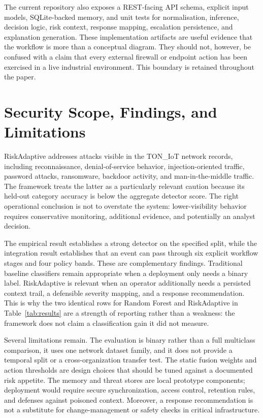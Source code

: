 \documentclass[conference]{IEEEtran}
\begin{document}
The current repository also exposes a REST-facing API schema, explicit input models, SQLite-backed memory, and unit tests for normalisation, inference, decision logic, risk context, response mapping, escalation persistence, and explanation generation. These implementation artifacts are useful evidence that the workflow is more than a conceptual diagram. They should not, however, be confused with a claim that every external firewall or endpoint action has been exercised in a live industrial environment. This boundary is retained throughout the paper.

\section{Security Scope, Findings, and Limitations}
RiskAdaptive addresses attacks visible in the TON\_IoT network records, including reconnaissance, denial-of-service behavior, injection-oriented traffic, password attacks, ransomware, backdoor activity, and man-in-the-middle traffic. The framework treats the latter as a particularly relevant caution because its held-out category accuracy is below the aggregate detector score. The right operational conclusion is not to overstate the system: lower-visibility behavior requires conservative monitoring, additional evidence, and potentially an analyst decision.

The empirical result establishes a strong detector on the specified split, while the integration result establishes that an event can pass through six explicit workflow stages and four policy bands. These are complementary findings. Traditional baseline classifiers remain appropriate when a deployment only needs a binary label. RiskAdaptive is relevant when an operator additionally needs a persisted context trail, a defensible severity mapping, and a response recommendation. This is why the two identical rows for Random Forest and RiskAdaptive in Table~\ref{tab:results} are a strength of reporting rather than a weakness: the framework does not claim a classification gain it did not measure.

Several limitations remain. The evaluation is binary rather than a full multiclass comparison, it uses one network dataset family, and it does not provide a temporal split or a cross-organization transfer test. The static fusion weights and action thresholds are design choices that should be tuned against a documented risk appetite. The memory and threat stores are local prototype components; deployment would require secure synchronization, access control, retention rules, and defenses against poisoned context. Moreover, a response recommendation is not a substitute for change-management or safety checks in critical infrastructure.
\end{document}
